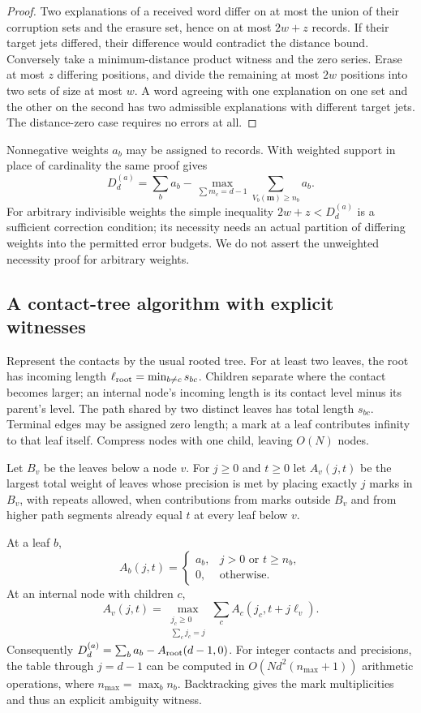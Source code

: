 \begin{proof}
Two explanations of a received word differ on at most the union of their
corruption sets and the erasure set, hence on at most $2w+z$ records. If their
target jets differed, their difference would contradict the distance bound.
Conversely take a minimum-distance product witness and the zero series.
Erase at most $z$ differing positions, and divide the remaining at most
$2w$ positions into two sets of size at most $w$. A word agreeing with one
explanation on one set and the other on the second has two admissible
explanations with different target jets. The distance-zero case requires no
errors at all.
\end{proof}

Nonnegative weights $a_b$ may be assigned to records. With weighted support
in place of cardinality the same proof gives
\[
 D_d^{(a)}=\sum_ba_b-
 \max_{\sum m_c=d-1}\sum_{V_b(\mathbf m)\ge n_b}a_b.
\]
For arbitrary indivisible weights the simple inequality $2w+z<D_d^{(a)}$ is
a sufficient correction condition; its necessity needs an actual partition
of differing weights into the permitted error budgets. We do not assert the
unweighted necessity proof for arbitrary weights.

\subsection{A contact-tree algorithm with explicit witnesses}

Represent the contacts by the usual rooted tree. For at least two leaves,
the root has incoming length $\ell_{\rm root}=\min_{b\ne c}s_{bc}$.
Children separate where the contact becomes larger; an internal node's
incoming length is its contact level minus its parent's level. The path
shared by two distinct leaves has total length $s_{bc}$. Terminal edges
may be assigned zero length; a mark at a leaf contributes infinity to that
leaf itself. Compress nodes with one child, leaving $O(N)$ nodes.

Let $B_v$ be the leaves below a node $v$. For $j\ge0$ and $t\ge0$ let
$A_v(j,t)$ be the largest total weight of leaves whose precision is met by
placing exactly $j$ marks in $B_v$, with repeats allowed, when contributions
from marks outside $B_v$ and from higher path segments already equal $t$ at
every leaf below $v$.

\begin{theorem}\label{thm:tree}
At a leaf $b$,
\[
 A_b(j,t)=\begin{cases}a_b,&j>0\text{ or }t\ge n_b,\\0,&\text{otherwise}.
 \end{cases}
\]
At an internal node with children $c$,
\[
 \boxed{\quad A_v(j,t)=
 \max_{\substack{j_c\ge0\\\sum_cj_c=j}}
       \sum_c A_c(j_c,t+j\ell_v).\quad}
\]
Consequently $D_d^{(a)}=\sum_ba_b-A_{\rm root}(d-1,0)$.
For integer contacts and precisions, the table through $j=d-1$ can be
computed in $O(Nd^2(n_{\max}+1))$ arithmetic operations, where
$n_{\max}=\max_b n_b$. Backtracking gives the mark multiplicities and thus
an explicit ambiguity witness.
\end{theorem}

